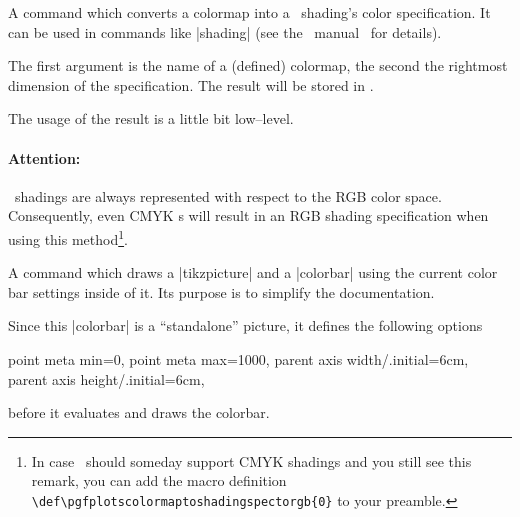 \begin{command}{\pgfplotscolormaptoshadingspec{}}
	A command which converts a colormap into a \PGF\ shading's color specification. It can be used in commands like |\pgfdeclare*shading| (see the \PGF\ manual~\cite{tikz} for details).

	The first argument is the name of a (defined) colormap, the second the rightmost dimension of the specification. The result will be stored in .
\begin{codeexample}[]
	\result
	\def\tempb{\pgfdeclarehorizontalshading{tempshading}{1cm}}%
	\expandafter\tempb\expandafter{\result}%
\end{codeexample}
The usage of the result  is a little bit low--level.

	\paragraph{Attention:} \PGF\ shadings are always represented with respect to the RGB color space. Consequently, even CMYK s will result in an RGB shading specification when using this method\footnote{In case \PGF\ should someday support CMYK shadings and you still see this remark, you can add the macro definition \texttt{\textbackslash def\textbackslash pgfplotscolormaptoshadingspectorgb\{0\}} to your preamble.}.
\end{command}

\begin{command}{\pgfplotscolorbardrawstandalone{}}
	A command which draws a |tikzpicture| and a |colorbar| using the current color bar settings inside of it. Its purpose is to simplify the documentation.
	
	Since this |colorbar| is a ``standalone'' picture, it defines the following options
\begin{codeexample}
	point meta min=0,
	point meta max=1000,
	parent axis width/.initial=6cm,
	parent axis height/.initial=6cm,
\end{codeexample}
	before it evaluates  and draws the colorbar.
\end{command}

